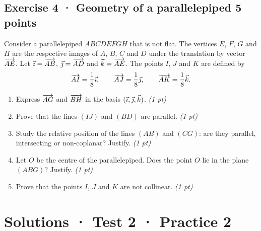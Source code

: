 \subsection*{Exercise 4 · Geometry of a parallelepiped \hfill 5 points}Consider a parallelepiped $ABCDEFGH$ that is not flat. The vertices $E$, $F$, $G$ and $H$ are the respective images of $A$, $B$, $C$ and $D$ under the translation by vector $\overrightarrow{AE}$.
Let $\vec{\imath}=\overrightarrow{AB}$, $\vec{\jmath}=\overrightarrow{AD}$ and $\vec k=\overrightarrow{AE}$.
The points $I$, $J$ and $K$ are defined by
\[\overrightarrow{AI}=\frac1{8}\vec{\imath},\qquad\overrightarrow{AJ}=\frac1{8}\vec{\jmath},\qquad\overrightarrow{AK}=\frac1{8}\vec k.\]

\begin{enumerate}

\item Express $\overrightarrow{AG}$ and $\overrightarrow{BH}$ in the basis $(\vec{\imath},\vec{\jmath},\vec k)$. \hfill\textit{(1 pt)}

\item Prove that the lines $(IJ)$ and $(BD)$ are parallel. \hfill\textit{(1 pt)}

\item Study the relative position of the lines $(AB)$ and $(CG)$: are they parallel, intersecting or non-coplanar? Justify. \hfill\textit{(1 pt)}

\item Let $O$ be the centre of the parallelepiped. Does the point $O$ lie in the plane $(ABG)$? Justify. \hfill\textit{(1 pt)}

\item Prove that the points $I$, $J$ and $K$ are not collinear. \hfill\textit{(1 pt)}

\end{enumerate}

\ifprof\clearpage

\section*{Solutions · Test 2 · Practice 2}\label{cor:2-2}


